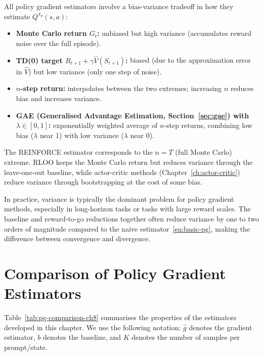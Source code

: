 All policy gradient estimators involve a bias-variance tradeoff in how they estimate $Q^{\pi_\theta}(s,a)$:
\begin{itemize}[leftmargin=*]
\item \textbf{Monte Carlo return $G_t$:} unbiased but high variance (accumulates reward noise over the full episode).
\item \textbf{TD(0) target $R_{t+1} + \gamma \hat V(S_{t+1})$:} biased (due to the approximation error in $\hat V$) but low variance (only one step of noise).
\item \textbf{$n$-step return:} interpolates between the two extremes; increasing $n$ reduces bias and increases variance.
\item \textbf{GAE (Generalised Advantage Estimation, Section~\ref{sec:gae}) with $\lambda \in [0,1]$:} exponentially weighted average of $n$-step returns, combining low bias ($\lambda$ near 1) with low variance ($\lambda$ near 0).
\end{itemize}

The REINFORCE estimator corresponds to the $n = T$ (full Monte Carlo) extreme.  RLOO keeps the Monte Carlo return but reduces variance through the leave-one-out baseline, while actor-critic methods (Chapter~\ref{ch:actor-critic}) reduce variance through bootstrapping at the cost of some bias.

\begin{remark}
\label{rem:variance-dominates}
In practice, variance is typically the dominant problem for policy gradient methods, especially in long-horizon tasks or tasks with large reward scales.  The baseline and reward-to-go reductions together often reduce variance by one to two orders of magnitude compared to the naive estimator~\eqref{eq:basic-pg}, making the difference between convergence and divergence.
\end{remark}

\section{Comparison of Policy Gradient Estimators}
\label{sec:pg-comparison}


Table~\ref{tab:pg-comparison-ch8} summarises the properties of the estimators developed in this chapter.  We use the following notation: $\hat g$ denotes the gradient estimator, $b$ denotes the baseline, and $K$ denotes the number of samples per prompt/state.

